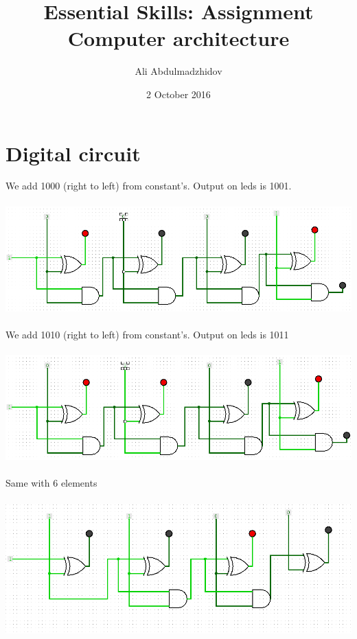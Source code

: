 \documentclass[10pt]{article}
\title{Essential Skills: Assignment Computer architecture}
\date{2 October 2016}
\author{Ali Abdulmadzhidov}
\begin{document}
\renewcommand*\rmdefault{cmss}
\maketitle
\section{Digital circuit}
We add 1000 (right to left) from constant's. Output on leds is 1001. \\ \\
\includegraphics[width=\textwidth, scale=0.5]{circuit1} \\ \\
We add 1010 (right to left) from constant's. Output on leds is 1011 \\ \\
\includegraphics[width=\textwidth, scale=0.5]{circuit2} \\ \\

Same with 6 elements \\ \\
\includegraphics[width=\textwidth, scale=0.5]{circuit3} \\ \\
\end{document}
